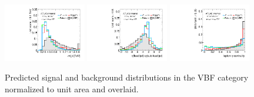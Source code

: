 \begin{figure}[tp]
  \includegraphics[width=0.32\textwidth]{figures/overlaid/vbf/dijet-m-veryhigh}
  \includegraphics[width=0.32\textwidth]{figures/overlaid/vbf/jets-etaprod}
  \includegraphics[width=0.32\textwidth]{figures/overlaid/vbf/lep-eta-centrality} \\
  \caption{Predicted signal and background distributions in the VBF category normalized to unit area and overlaid.}
  \label{fig:strategy-overlaid-vbf-2}
\end{figure}
